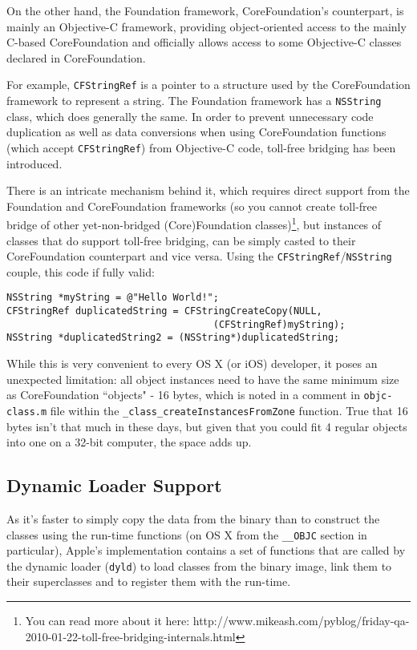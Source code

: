 On the other hand, the Foundation framework, CoreFoundation's counterpart, is mainly an Objective-C framework, providing object-oriented access to the mainly C-based CoreFoundation and officially allows access to some Objective-C classes declared in CoreFoundation.

For example, \verb=CFStringRef= is a pointer to a structure used by the CoreFoundation framework to represent a string. The Foundation framework has a \verb=NSString= class, which does generally the same. In order to prevent unnecessary code duplication as well as data conversions when using CoreFoundation functions (which accept \verb=CFStringRef=) from Objective-C code, toll-free bridging has been introduced.

There is an intricate mechanism behind it, which requires direct support from the Foundation and CoreFoundation frameworks (so you cannot create toll-free bridge of other yet-non-bridged (Core)Foundation classes)\footnote{You can read more about it here: http://www.mikeash.com/pyblog/friday-qa-2010-01-22-toll-free-bridging-internals.html}, but instances of classes that do support toll-free bridging, can be simply casted to their CoreFoundation counterpart and vice versa. Using the \verb=CFStringRef=/\verb=NSString= couple, this code if fully valid:

\begin{verbatim}
NSString *myString = @"Hello World!";
CFStringRef duplicatedString = CFStringCreateCopy(NULL, 
                                    (CFStringRef)myString);
NSString *duplicatedString2 = (NSString*)duplicatedString;
\end{verbatim}

While this is very convenient to every OS X (or iOS) developer, it poses an unexpected limitation: all object instances need to have the same minimum size as CoreFoundation ``objects" - 16 bytes, which is noted in a comment in \verb=objc-class.m= file within the \verb=_class_createInstancesFromZone= function. True that 16 bytes isn't that much in these days, but given that you could fit 4 regular objects into one on a 32-bit computer, the space adds up.

\subsection{Dynamic Loader Support}
As it's faster to simply copy the data from the binary than to construct the classes using the run-time functions (on OS X from the \verb=__OBJC= section in particular), Apple's implementation contains a set of functions that are called by the dynamic loader (\verb=dyld=) to load classes from the binary image, link them to their superclasses and to register them with the run-time.


